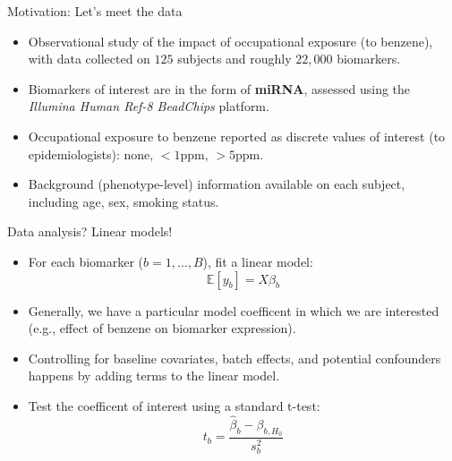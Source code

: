 \documentclass[12pt,t]{beamer}
\begin{document}
\begin{frame}[c]{Motivation: Let's meet the data}
\begin{center}
\begin{itemize}
  \itemsep12pt
  \item Observational study of the impact of occupational exposure (to benzene),
    with data collected on $125$ subjects and roughly $22,000$ biomarkers.
  \item Biomarkers of interest are in the form of \textbf{miRNA}, assessed
    using the \textit{Illumina Human Ref-8 BeadChips} platform.
  \item Occupational exposure to benzene reported as discrete values of
    interest (to epidemiologists): none, $<1$ppm, $>5$ppm.
  \item Background (phenotype-level) information available on each subject,
    including age, sex, smoking status.
\end{itemize}
\end{center}


\end{frame}



\begin{frame}[c]{Data analysis? Linear models!}
\begin{center}
\begin{itemize}
  \itemsep12pt
  \item For each biomarker ($b = 1, \dots, B$), fit a linear model:
    \[
    \mathbb{E}[y_b] = X \beta_b
    \]
  \item Generally, we have a particular model coefficent in which we are
    interested (e.g., effect of benzene on biomarker expression).
  \item Controlling for baseline covariates, batch effects, and potential
    confounders happens by adding terms to the linear model.
  \item Test the coefficent of interest using a standard t-test:
    \[
      t_{b} = \frac{\hat{\beta}_{b} - \beta_{b, H_0}}{s^2_b}
    \]
\end{itemize}
\end{center}


\end{frame}
\end{document}
